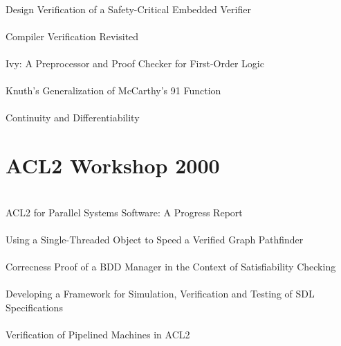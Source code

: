 \documentclass{article}
\begin{document}
\cite{99-bertoli-verifier} \\
Design Verification of a Safety-Critical Embedded Verifier \\

\cite{99-goerigk-compiler} \\
Compiler Verification Revisited \\

\cite{99-mccune-ivy} \\
{Ivy}: A Preprocessor and Proof Checker for First-Order Logic \\

\cite{99-cowles-91} \\
{Knuth}'s Generalization of {McCarthy}'s 91 Function \\

\cite{99-gamboa-differentiability} \\
Continuity and Differentiability \\


\section{ACL2 Workshop 2000}

\cite{00-lusk-parallel} \\
ACL2 for Parallel Systems Software: A Progress Report \\

\cite{00-wilding-stobj} \\
Using a Single-Threaded Object to Speed a Verified Graph Pathfinder \\

\cite{00-sumners-bdds} \\
Correcness Proof of a BDD Manager in the Context of Satisfiability Checking \\

\cite{00-shumsky-sdl} \\
Developing a Framework for Simulation, Verification and Testing of SDL Specifications \\

\cite{00-manolios-pipeline} \\
Verification of Pipelined Machines in ACL2 \\
\end{document}
